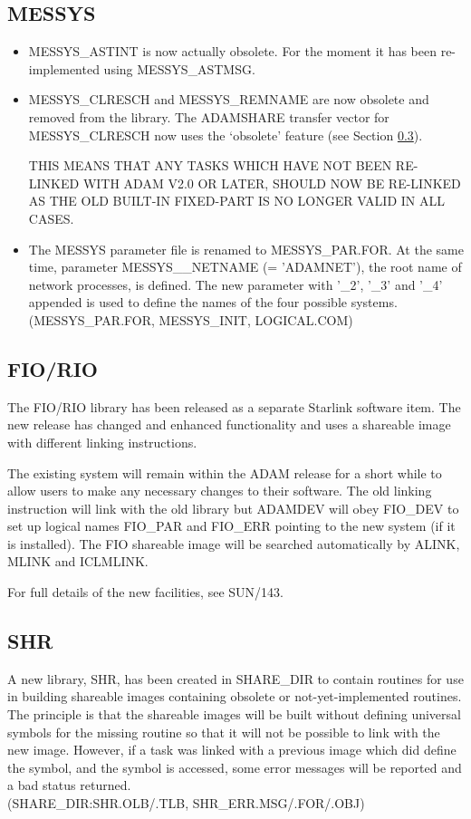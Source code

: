 \subsection{MESSYS}
\begin{itemize}
\item MESSYS\_ASTINT is now actually obsolete. For the moment it has been
re-implemented using MESSYS\-\_ASTMSG.
\item MESSYS\_CLRESCH and MESSYS\-\_REMNAME are now obsolete and removed from
the library. The ADAMSHARE transfer vector for MESSYS\-\_CLRESCH now uses the
`obsolete' feature (see Section \ref{shr}).

THIS MEANS THAT ANY TASKS WHICH HAVE NOT BEEN RE-LINKED WITH ADAM V2.0 OR
LATER, SHOULD NOW BE RE-LINKED AS THE OLD BUILT-IN FIXED-PART IS NO LONGER
VALID IN ALL CASES.
\item The MESSYS parameter file is renamed to MESSYS\_PAR.FOR. At the same
time,
parameter MESSYS\_\_NETNAME (= 'ADAMNET'), the root name of network processes,
is defined. The new parameter with '\_2', '\_3' and '\_4' appended is used
to define the names of the four possible systems.\\
(MESSYS\_PAR.FOR, MESSYS\_INIT, LOGICAL.COM)
\end{itemize}

\subsection{FIO/RIO}
The FIO/RIO library has been released as a separate Starlink software item.
The new release has changed and enhanced functionality and uses a shareable
image with different linking instructions.

The existing system will remain within the ADAM release for a short while to
allow users to make any necessary changes to their software. The old linking
instruction will link with the old library but ADAMDEV will obey FIO\_DEV to
set up logical names FIO\_PAR and FIO\_ERR pointing to the new system (if it
is installed).
The FIO shareable image will be searched automatically by ALINK, MLINK and
ICLMLINK.

For full details of the new facilities, see SUN/143.

\subsection{SHR}
\label{shr}
A new library, SHR,  has been created in SHARE\_DIR to contain routines
for use in building shareable images containing obsolete or not-yet-implemented
routines. The principle is that the shareable images will be built without
defining universal symbols for the missing routine so that it will not be
possible to link with the new image. However, if a task was linked with a
previous image which did define the symbol, and the symbol is accessed, some
error messages will be reported and a bad status returned.\\
(SHARE\_DIR:SHR.OLB/.TLB, SHR\_ERR.MSG/.FOR/.OBJ)

